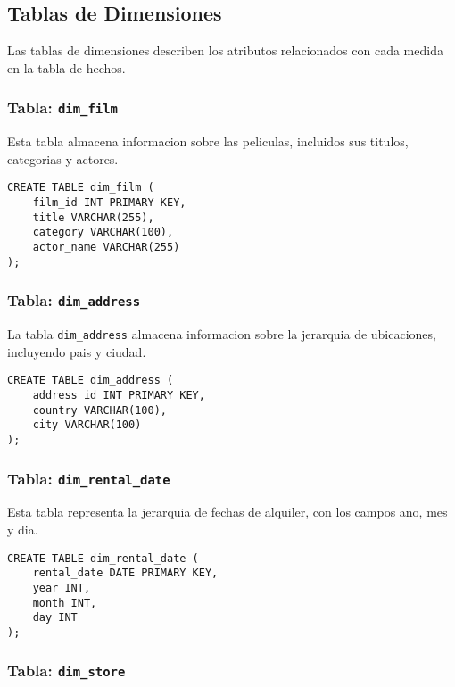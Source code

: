 \documentclass{article}
\begin{document}
\newpage
\subsection{Tablas de Dimensiones}

Las tablas de dimensiones describen los atributos relacionados con cada medida en la tabla de hechos.

\subsubsection{Tabla: \texttt{dim\_film}}

Esta tabla almacena informacion sobre las peliculas, incluidos sus titulos, categorias y actores.

\begin{lstlisting}
CREATE TABLE dim_film (
    film_id INT PRIMARY KEY,
    title VARCHAR(255),
    category VARCHAR(100),
    actor_name VARCHAR(255)
);
\end{lstlisting}

\subsubsection{Tabla: \texttt{dim\_address}}

La tabla \texttt{dim\_address} almacena informacion sobre la jerarquia de ubicaciones, incluyendo pais y ciudad.

\begin{lstlisting}
CREATE TABLE dim_address (
    address_id INT PRIMARY KEY,
    country VARCHAR(100),
    city VARCHAR(100)
);
\end{lstlisting}

\subsubsection{Tabla: \texttt{dim\_rental\_date}}

Esta tabla representa la jerarquia de fechas de alquiler, con los campos ano, mes y dia.

\begin{lstlisting}
CREATE TABLE dim_rental_date (
    rental_date DATE PRIMARY KEY,
    year INT,
    month INT,
    day INT
);
\end{lstlisting}

\subsubsection{Tabla: \texttt{dim\_store}}
\end{document}
